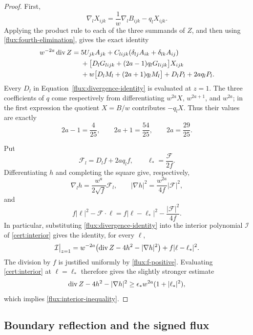 \begin{proof}
First,
\[
 \nabla_lX_{ijk}=\frac1w\nabla_lB_{ijk}-q_lX_{ijk}.
\]
Applying the product rule to each of the three summands of $Z$, and
then using \eqref{flux:fourth-elimination}, gives the exact identity
\begin{align}
 w^{-2a}\operatorname{div} Z
 ={}&5U_{jk}A_{jk}
       +C_{lijk}(\delta_{lj}A_{ik}+\delta_{lk}A_{ij})\notag\\
 &+\bigl[D_lG_{lijk}+(2a-1)q_lG_{lijk}\bigr]X_{ijk}\notag\\
 &+w\bigl[D_lM_l+(2a+1)q_lM_l\bigr]
       +D_lP_l+2aq_lP_l.\label{flux:divergence-identity}
\end{align}
Every $D_l$ in Equation~\eqref{flux:divergence-identity} is evaluated at $z=1$.
The three coefficients of $q$ come respectively from differentiating
$w^{2a}X$, $w^{2a+1}$, and $w^{2a}$; in the first expression the quotient
$X=B/w$ contributes $-q_lX$.  Thus their values are exactly
\[
 2a-1=\frac4{25},\qquad 2a+1=\frac{54}{25},\qquad
 2a=\frac{29}{25}.
\]

Put
\[
 \mathcal F_l=D_lf+2aq_lf,\qquad
 \ell_* =\frac{\mathcal F}{2f}.
\]
Differentiating $h$ and completing the square give, respectively,
\begin{equation}\label{flux:square-root-derivative}
 \nabla_lh=\frac{w^a}{2\sqrt f}\mathcal F_l,
 \qquad
 |\nabla h|^2=\frac{w^{2a}}{4f}|\mathcal F|^2,
\end{equation}
and
\[
 f|\ell|^2-\mathcal F\cdot\ell
 =f|\ell-\ell_*|^2-\frac{|\mathcal F|^2}{4f}.
\]
In particular, substituting \eqref{flux:divergence-identity} into the
interior polynomial $\mathcal I$ of \eqref{cert:interior} gives the
identity, for every $\ell$,
\begin{equation}\label{flux:square-completion}
 \mathcal I\big|_{z=1}
 =w^{-2a}\bigl(\operatorname{div} Z-4h^2-|\nabla h|^2\bigr)
      +f|\ell-\ell_*|^2.
\end{equation}
The division by $f$ is justified uniformly by
\eqref{flux:f-positive}.  Evaluating \eqref{cert:interior} at
$\ell=\ell_*$ therefore gives the slightly stronger estimate
\[
 \operatorname{div} Z-4h^2-|\nabla h|^2
 \geq\epsilon_*w^{2a}(1+|\ell_*|^2),
\]
which implies \eqref{flux:interior-inequality}.
\end{proof}

\subsection{Boundary reflection and the signed flux}

